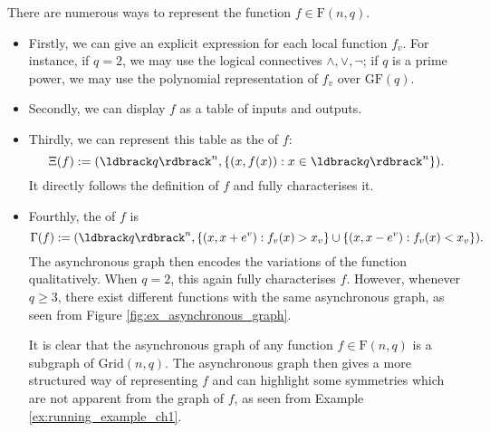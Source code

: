 \documentclass[a4paper, 11pt]{book}
\numberwithin{equation}{section}
\theoremstyle{plain}
\newcommand{\graph}{\Xi}
\newcommand{\AGraph}{\Gamma}
\newcommand{\functions}{\mathrm{F}}
\newcommand{\GF}{\mathrm{GF}}
\renewcommand{\(}{\ldbrack}
\renewcommand{\)}{\rdbrack}
\newcommand{\BF}[1]{{\bf\boldmath{#1}\unboldmath}}
\begin{document}

There are numerous ways to represent the function $f \in \functions(n,q)$. 

\begin{itemize}
\item Firstly, we can give an explicit expression for each local function $f_v$. For instance, if $q=2$, we may use the logical connectives $\land, \lor, \neg$; if $q$ is a prime power, we may use the polynomial representation of $f_v$ over $\GF(q)$. 

\item Secondly, we can display $f$ as a table of inputs and outputs. 

\item Thirdly, we can represent this table as the \BF{graph} of $f$:
\[
	\graph(f) := (\(q\)^n, \{(x, f(x)) : x \in \(q\)^n\}).
\]
It directly follows the definition of $f$ and fully characterises it.

\item Fourthly, the \BF{asynchronous graph} of $f$ is
\[
	\AGraph(f) := (\(q\)^n, \{(x, x + e^v): f_v(x) > x_v\} \cup \{(x, x - e^v): f_v(x) < x_v\}).
\]
The asynchronous graph then encodes the variations of the function qualitatively. When $q = 2$, this again fully characterises $f$. However, whenever $q \ge 3$, there exist different functions with the same asynchronous graph, as seen from Figure \ref{fig:ex_asynchronous_graph}.

It is clear that the asynchronous graph of any function $f \in \functions(n,q)$ is a subgraph of $\mathrm{Grid}(n,q)$. The asynchronous graph then gives a more structured way of representing $f$ and can highlight some symmetries which are not apparent from the graph of $f$, as seen from Example \ref{ex:running_example_ch1}.
\end{itemize}
\end{document}
